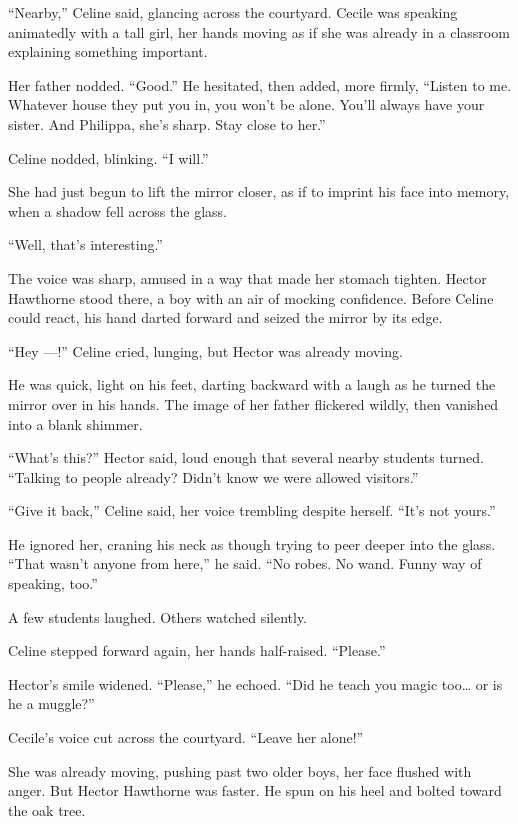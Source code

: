 \enquote{Nearby,} Celine said, glancing across the courtyard. Cecile was speaking animatedly with a tall girl, her hands moving as if she was already in a classroom explaining something important.
 
Her father nodded. \enquote{Good.} He hesitated, then added, more firmly, \enquote{Listen to me. Whatever house they put you in, you won't be alone. You'll always have your sister. And Philippa, she's sharp. Stay close to her.}
 
Celine nodded, blinking. \enquote{I will.}
 
She had just begun to lift the mirror closer, as if to imprint his face into memory, when a shadow fell across the glass.
 
\enquote{Well, that's interesting.}
 
The voice was sharp, amused in a way that made her stomach tighten. Hector Hawthorne stood there, a boy with an air of mocking confidence. Before Celine could react, his hand darted forward and seized the mirror by its edge.
 
\enquote{Hey ---!} Celine cried, lunging, but Hector was already moving.
 
He was quick, light on his feet, darting backward with a laugh as he turned the mirror over in his hands. The image of her father flickered wildly, then vanished into a blank shimmer.
 
\enquote{What's this?} Hector said, loud enough that several nearby students turned. \enquote{Talking to people already? Didn't know we were allowed visitors.}
 
\enquote{Give it back,} Celine said, her voice trembling despite herself. \enquote{It's not yours.}
 
He ignored her, craning his neck as though trying to peer deeper into the glass. \enquote{That wasn't anyone from here,} he said. \enquote{No robes. No wand. Funny way of speaking, too.}
 
A few students laughed. Others watched silently.
 
Celine stepped forward again, her hands half-raised. \enquote{Please.}
 
Hector's smile widened. \enquote{Please,} he echoed. \enquote{Did he teach you magic too\ldots{} or is he a muggle?}
 
Cecile's voice cut across the courtyard. \enquote{Leave her alone!}
 
She was already moving, pushing past two older boys, her face flushed with anger. But Hector Hawthorne was faster. He spun on his heel and bolted toward the oak tree.
 
